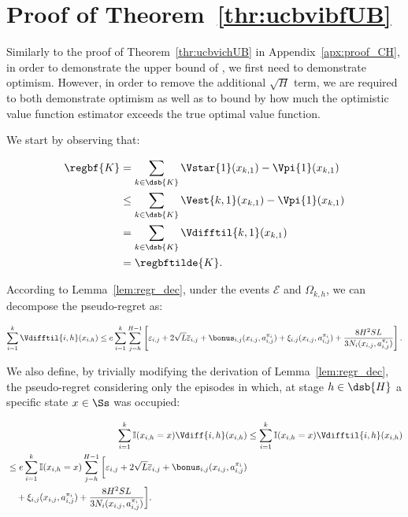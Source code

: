 \section{Proof of Theorem~\ref{thr:ucbvibfUB}}
\label{apx:proof_BF}

\ucbvibfUB*

Similarly to the proof of Theorem~\ref{thr:ucbvichUB} in Appendix~\ref{apx:proof_CH}, in order to demonstrate the upper bound of \ucbvibf, we first need to demonstrate optimism. However, in order to remove the additional $\sqrt{H}$ term, we are required to both demonstrate optimism as well as to bound by how much the optimistic value function estimator exceeds the true optimal value function.

We start by observing that:

\begin{align*}
    \regbf{K} &= \sum_{k \in \dsb{K}} \Vstar{1}(x_{k,1}) - \Vpi{1}(x_{k,1}) \\
    &\le \sum_{k \in \dsb{K}} \Vest{k,1}(x_{k,1}) - \Vpi{1}(x_{k,1}) \\
    &= \sum_{k \in \dsb{K}} \Vdifftil{k,1}(x_{k,1}) \\
    &= \regbftilde{K}.
\end{align*}

According to Lemma~\ref{lem:regr_dec}, under the events $\mathcal{E}$ and $\Omega_{k,h}$, we can decompose the pseudo-regret as:

\begin{equation}
    \sum_{i=1}^k \Vdifftil{i,h}(x_{i,h}) \le e \sum_{i=1}^k \sum_{j=h}^{H-1} \left[ \varepsilon_{i,j} + 2 \sqrt{L} \overline{\varepsilon}_{i,j} + \bonus_{i,j}(x_{i,j},a_{i,j}^{\pi_i}) + \xi_{i,j} (x_{i,j}, a_{i,j}^{\pi_i}) + \frac{8H^2SL}{3 N_i (x_{i,j}, a_{i,j}^{\pi_i})} \right]. \label{thr:ucbvibfUB:1}
\end{equation}

We also define, by trivially modifying the derivation of Lemma~\ref{lem:regr_dec}, the pseudo-regret considering only the episodes in which, at stage $h \in \dsb{H}$ a specific state $x \in \Ss$ was occupied:

\begin{align}
    \sum_{i=1}^k \mathbb{I}(x_{i,h} = x) \Vdiff{i,h}(x_{i,h}) &\le \sum_{i=1}^k \mathbb{I}(x_{i,h} = x) \Vdifftil{i,h}(x_{i,h}) \nonumber \\
    \begin{split}
    \label{thr:ucbvibfUB:2}
    &\le e \sum_{i=1}^k \mathbb{I}(x_{i,h} = x) \sum_{j=h}^{H-1} \bigg[ \varepsilon_{i,j} + 2 \sqrt{L} \overline{\varepsilon}_{i,j} + \bonus_{i,j}(x_{i,j},a_{i,j}^{\pi_i}) \\
    &\quad + \xi_{i,j} (x_{i,j}, a_{i,j}^{\pi_i}) + \frac{8H^2SL}{3 N_i (x_{i,j}, a_{i,j}^{\pi_i})} \bigg]. 
    \end{split}
\end{align}

